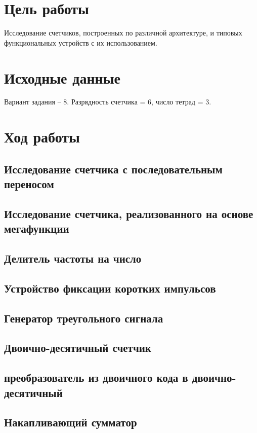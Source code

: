 \documentclass[a4paper,12pt]{article}
\begin{document}
    

    \tableofcontents

    \section{Цель работы}
    Исследование счетчиков, построенных по различной архитектуре, и типовых функциональных устройств с их использованием.
    \section{Исходные данные}
    Вариант задания -- 8. Разрядность счетчика = 6, число тетрад = 3.
    \section{Ход работы}
    \subsection{Исследование счетчика с последовательным переносом}
    \subsection{Исследование счетчика, реализованного на основе мегафункции}
    \subsection{Делитель частоты на число}
    \subsection{Устройство фиксации коротких импульсов}
    \subsection{Генератор треугольного сигнала}
    \subsection{Двоично-десятичный счетчик}
    \subsection{преобразователь из двоичного кода в двоично-десятичный}
    \subsection{Накапливающий сумматор}
\end{document}
